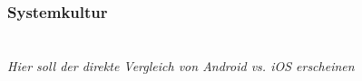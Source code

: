 \begin{frame}
\frametitle{Systemkultur}
\framesubtitle{}
	\\
	\textsl{Hier soll der direkte Vergleich von Android vs. iOS erscheinen}
	\begin{table}
	\end{table}
\end{frame}